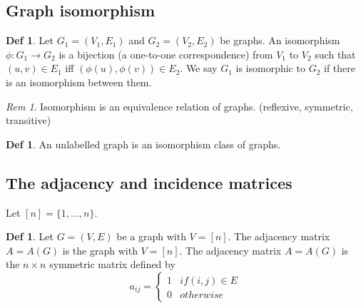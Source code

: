 \documentclass[11pt, fleqn, a4paper, landscape]{article}
\theoremstyle{plain} %
\theoremstyle{remark} %
\newtheorem{rem}[thm]{Rem}
\theoremstyle{definition} %
\newtheorem{defi}[thm]{Def}
\begin{document}
\begin{multicols}{5}
\subsection{Graph isomorphism}
\addtocounter{thm}{1}
\begin{defi}
 Let $G_1 = (V_1,E_1)$ and $G_2 = (V_2,E_2)$ be graphs. An isomorphism $\phi: G_1 \to G_2$ is a bijection (a one-to-one correspondence) from $V_1$ to $V_2$ such that $(u, v) \in E_1$ iff $(\phi(u), \phi(v))\in E_2$. We say $G_1$ is isomorphic to $G_2$ if there is an isomorphism between them.
\end{defi}
\addtocounter{thm}{1}
\begin{rem}
Isomorphism is an equivalence relation of graphs. (reflexive, symmetric, transitive)
\end{rem}


\begin{defi}
An unlabelled graph is an isomorphism class of graphs.
\end{defi} 

\subsection{The adjacency and incidence matrices}

Let $[n] = \{1, \dots , n\}.$

\begin{defi}
Let $G = (V,E)$ be a graph with $V = [n].$ The adjacency matrix $A = A(G)$ is the graph with $ V = [n]$. The adjacency matrix $A = A(G)$ is the
$n \times n $ symmetric matrix defined by
\[a_{ij}=\begin{cases}1 & if (i,j)\in E\\ 0 & otherwise\end{cases}\]
\end{defi} 
\addtocounter{thm}{1}
\addtocounter{thm}{1}


\end{multicols}
\end{document}
